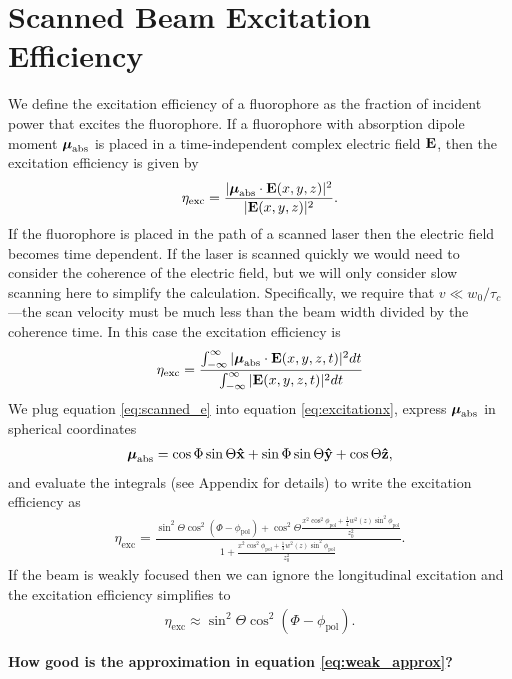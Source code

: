 \documentclass[11pt]{article}
\begin{document}
\section{Scanned Beam Excitation Efficiency}
We define the excitation efficiency of a fluorophore as the fraction of 
incident power that excites the fluorophore. If a fluorophore with absorption
dipole moment $\boldsymbol{\mu}_{\text{abs}}$ is placed in a time-independent complex
electric field $\mathbf{E}$, then the excitation efficiency is given by
\begin{align}
  \eta_{\text{exc}} = \frac{|\boldsymbol{\mu}_{\text{abs}} \cdot \mathbf{E}(x,y,z)|^2}{|\mathbf{E}(x,y,z) |^2}.
\end{align}
If the fluorophore is placed in the path of a scanned laser then the electric
field becomes time dependent. If the laser is scanned quickly we would need to
consider the coherence of the electric field, but we will only consider slow
scanning here to simplify the calculation. Specifically, we require that
$v \ll w_0/\tau_c$---the scan velocity must be much less than the beam width
divided by the coherence time. In this case the excitation efficiency is
\begin{align}
  \eta_{\text{exc}} = \frac{\int_{-\infty}^{\infty}|\boldsymbol{\mu}_{\text{abs}} \cdot \mathbf{E}(x,y,z,t)|^2dt}{\int_{-\infty}^{\infty}|\mathbf{E}(x,y,z,t)|^2dt}\label{eq:excitationx}
\end{align}
We plug equation \ref{eq:scanned_e} into equation \ref{eq:excitationx}, express
$\boldsymbol{\mu}_{\text{abs}}$ in spherical coordinates
\begin{align}
  \boldsymbol{\mu}_{\text{abs}} = \cos\Phi\sin\Theta\mathbf{\hat{x}} + \sin\Phi\sin\Theta\mathbf{\hat{y}} + \cos\Theta\mathbf{\hat{z}},
\end{align}
and evaluate the integrals (see Appendix for details) to write the
excitation efficiency as
\begin{align}
  \eta_{\text{exc}} = \frac{\sin^2\Theta\cos^2(\Phi-\phi_{\text{pol}}) + \cos^2\Theta\frac{x^2\cos^2\phi_{\text{pol}} + \frac{1}{4}w^2(z)\sin^2\phi_{\text{pol}}}{z_0^2}}{1+\frac{x^2\cos^2\phi_{\text{pol}} + \frac{1}{4}w^2(z)\sin^2\phi_{\text{pol}}}{z_0^2}}.\label{eq:strong}
\end{align}
If the beam is weakly focused then we can ignore the longitudinal excitation and
the excitation efficiency simplifies to
\begin{align}
  \eta_{\text{exc}} \approx \sin^2\Theta\cos^2(\Phi-\phi_{\text{pol}}).\label{eq:weak_approx}
\end{align}

\textbf{How good is the approximation in equation \ref{eq:weak_approx}?}
\end{document}
